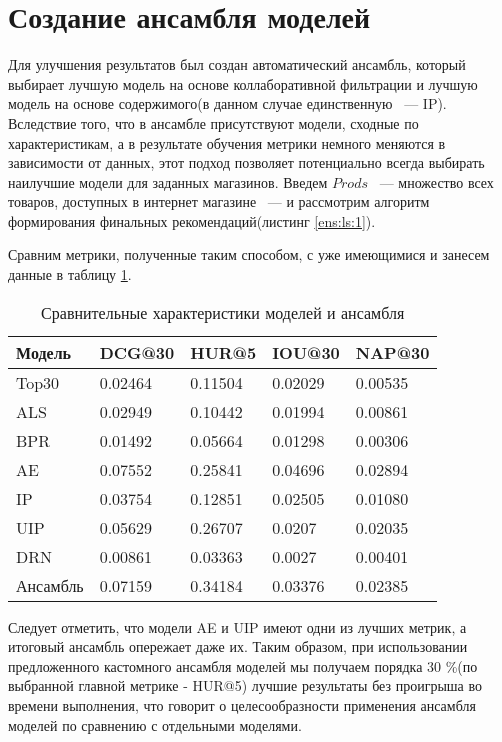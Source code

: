 \documentclass[14pt]{mmcs_article}
\begin{document}

\section{Создание ансамбля моделей}
Для улучшения результатов был создан автоматический ансамбль, который выбирает лучшую модель на основе коллаборативной фильтрации и лучшую модель на основе содержимого(в данном случае единственную ~--- IP).  Вследствие того, что в ансамбле присутствуют модели, сходные по характеристикам, а в результате обучения метрики немного меняются в зависимости от данных, этот подход позволяет потенциально всегда выбирать наилучшие модели для заданных магазинов.
Введем $Prods$ ~--- множество всех товаров, доступных в интернет магазине ~--- и рассмотрим алгоритм формирования финальных рекомендаций(листинг \ref{ens:ls:1}). 

Сравним метрики, полученные таким способом, с уже имеющимися и занесем данные в таблицу \ref{fin:table:1}.

\begin{table}[H]
	\centering
	\caption{Сравнительные характеристики моделей и ансамбля}\label{fin:table:1}

\begin{tabular}{| l |l| l| l| l|}
	\hline
	Модель & DCG@30 & HUR@5 & IOU@30 &  NAP@30 \\
	\hline
	Top30 & 0.02464 & 0.11504 & 0.02029 & 0.00535 \\
	\hline
	ALS & 0.02949 & 0.10442 & 0.01994 &  0.00861 \\
	\hline
	BPR & 0.01492 & 0.05664 & 0.01298 & 0.00306\\
	\hline
	AE & 0.07552 & 0.25841 & 0.04696 &  0.02894 \\
	\hline
	IP & 0.03754 & 0.12851 & 0.02505 & 0.01080 \\
	\hline
	UIP & 0.05629 & 0.26707 & 0.0207 &  0.02035 \\
	\hline
	DRN & 0.00861 & 0.03363 & 0.0027 & 0.00401 \\
	\hline
	Ансамбль & 0.07159 & 0.34184 & 0.03376 &  0.02385 \\
	\hline
\end{tabular}
\end{table}
Следует отметить, что модели AE и UIP имеют одни из лучших метрик, а итоговый ансамбль опережает даже их. Таким образом, при использовании предложенного кастомного ансамбля моделей мы получаем порядка 30 \%(по выбранной главной метрике - HUR@5) лучшие результаты без проигрыша во времени выполнения, что говорит о целесообразности применения ансамбля моделей по сравнению с отдельными моделями. %
\end{document}
